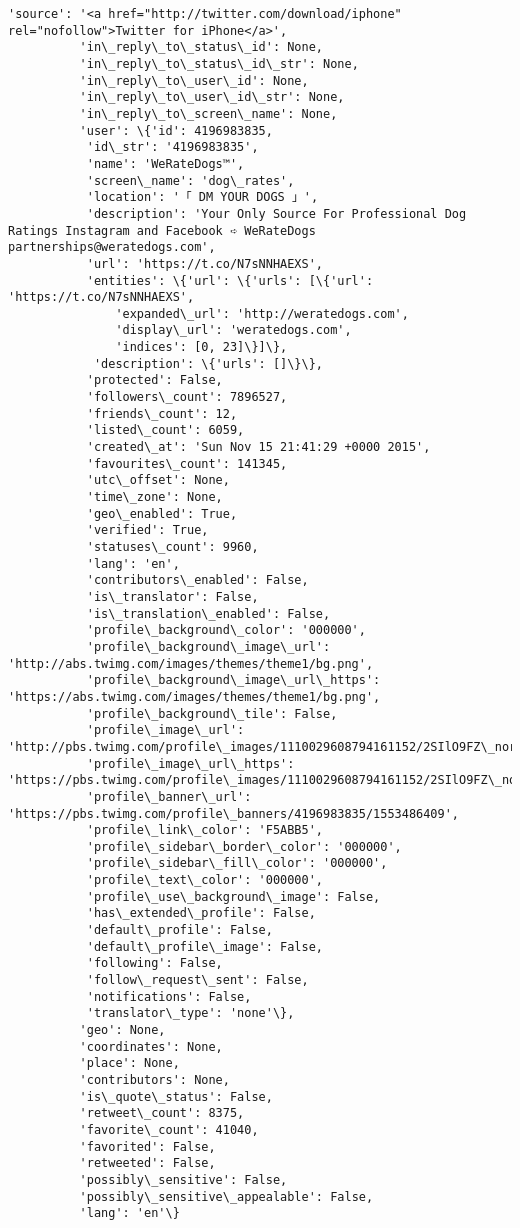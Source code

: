 \documentclass[11pt]{article}
\begin{document}
\begin{Verbatim}[commandchars=\\\{\}]
          'source': '<a href="http://twitter.com/download/iphone" rel="nofollow">Twitter for iPhone</a>',
          'in\_reply\_to\_status\_id': None,
          'in\_reply\_to\_status\_id\_str': None,
          'in\_reply\_to\_user\_id': None,
          'in\_reply\_to\_user\_id\_str': None,
          'in\_reply\_to\_screen\_name': None,
          'user': \{'id': 4196983835,
           'id\_str': '4196983835',
           'name': 'WeRateDogs™',
           'screen\_name': 'dog\_rates',
           'location': '「 DM YOUR DOGS 」',
           'description': 'Your Only Source For Professional Dog Ratings Instagram and Facebook ➪ WeRateDogs partnerships@weratedogs.com',
           'url': 'https://t.co/N7sNNHAEXS',
           'entities': \{'url': \{'urls': [\{'url': 'https://t.co/N7sNNHAEXS',
               'expanded\_url': 'http://weratedogs.com',
               'display\_url': 'weratedogs.com',
               'indices': [0, 23]\}]\},
            'description': \{'urls': []\}\},
           'protected': False,
           'followers\_count': 7896527,
           'friends\_count': 12,
           'listed\_count': 6059,
           'created\_at': 'Sun Nov 15 21:41:29 +0000 2015',
           'favourites\_count': 141345,
           'utc\_offset': None,
           'time\_zone': None,
           'geo\_enabled': True,
           'verified': True,
           'statuses\_count': 9960,
           'lang': 'en',
           'contributors\_enabled': False,
           'is\_translator': False,
           'is\_translation\_enabled': False,
           'profile\_background\_color': '000000',
           'profile\_background\_image\_url': 'http://abs.twimg.com/images/themes/theme1/bg.png',
           'profile\_background\_image\_url\_https': 'https://abs.twimg.com/images/themes/theme1/bg.png',
           'profile\_background\_tile': False,
           'profile\_image\_url': 'http://pbs.twimg.com/profile\_images/1110029608794161152/2SIlO9FZ\_normal.jpg',
           'profile\_image\_url\_https': 'https://pbs.twimg.com/profile\_images/1110029608794161152/2SIlO9FZ\_normal.jpg',
           'profile\_banner\_url': 'https://pbs.twimg.com/profile\_banners/4196983835/1553486409',
           'profile\_link\_color': 'F5ABB5',
           'profile\_sidebar\_border\_color': '000000',
           'profile\_sidebar\_fill\_color': '000000',
           'profile\_text\_color': '000000',
           'profile\_use\_background\_image': False,
           'has\_extended\_profile': False,
           'default\_profile': False,
           'default\_profile\_image': False,
           'following': False,
           'follow\_request\_sent': False,
           'notifications': False,
           'translator\_type': 'none'\},
          'geo': None,
          'coordinates': None,
          'place': None,
          'contributors': None,
          'is\_quote\_status': False,
          'retweet\_count': 8375,
          'favorite\_count': 41040,
          'favorited': False,
          'retweeted': False,
          'possibly\_sensitive': False,
          'possibly\_sensitive\_appealable': False,
          'lang': 'en'\}
\end{Verbatim}
            
\end{document}

